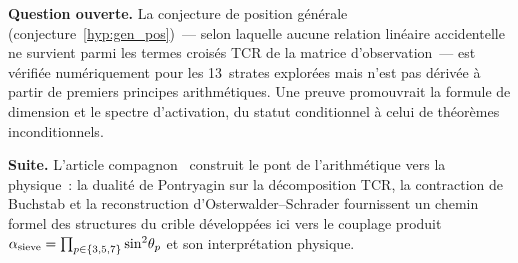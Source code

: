 \documentclass[12pt,a4paper]{article}
\begin{document}
\textbf{Question ouverte.}
La conjecture de position générale (conjecture~\ref{hyp:gen_pos})~---
selon laquelle aucune relation linéaire accidentelle ne survient
parmi les termes croisés TCR de la matrice d'observation~--- est
vérifiée numériquement pour les 13~strates explorées mais n'est pas
dérivée à partir de premiers principes arithmétiques. Une preuve
promouvrait la formule de dimension et le spectre d'activation, du
statut conditionnel à celui de théorèmes inconditionnels.

\textbf{Suite.}
L'article compagnon~\cite{companion_M5} construit le pont de
l'arithmétique vers la physique~: la dualité de Pontryagin sur la
décomposition TCR, la contraction de Buchstab et la reconstruction
d'Osterwalder--Schrader fournissent un chemin formel des structures
du crible développées ici vers le couplage produit
$\alpha_{\mathrm{sieve}} = \prod_{p \in \{3,5,7\}} \sin^2\!\theta_{p}$ et son
interprétation physique.



\end{document}
